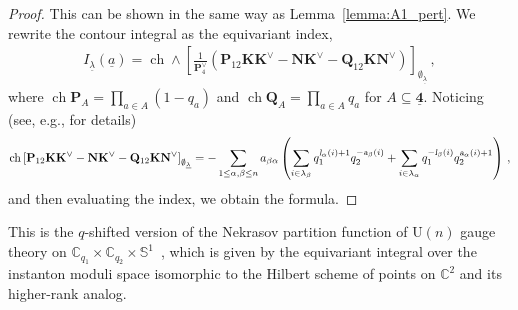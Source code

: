 \begin{proof}
    This can be shown in the same way as Lemma~\ref{lemma:A1_pert}.
    We rewrite the contour integral as the equivariant index,    
    \begin{align}
        I_{\underline{\lambda}} (\underline{a}) = \operatorname{ch} \wedge \left[ \frac{1}{\mathbf{P}_4^\vee} \left( \mathbf{P}_{12} \mathbf{K} \mathbf{K}^\vee - \mathbf{N} \mathbf{K}^\vee - \mathbf{Q}_{12} \mathbf{K} \mathbf{N}^\vee \right) \right]_{\emptyset_{\underline{\lambda}}} \, ,
    \end{align}
    where $\operatorname{ch} \mathbf{P}_{A} = \prod_{a \in A} (1-q_a)$ and $\operatorname{ch} \mathbf{Q}_{A} = \prod_{a \in A} q_{a}$ for $A \subseteq \underline{\mathbf{4}}$.
    Noticing (see, e.g., \cite{Nakajima:1999,Kimura:2020jxl} for details)
    \begin{align}
        \operatorname{ch} \left[ \mathbf{P}_{12} \mathbf{K} \mathbf{K}^\vee - \mathbf{N} \mathbf{K}^\vee - \mathbf{Q}_{12} \mathbf{K} \mathbf{N}^\vee \right]_{\emptyset_{\underline{\lambda}}} = - \sum_{1 \le \alpha, \beta \le n} a_{\beta \alpha} \left( \sum_{i \in \lambda_\beta} q_1^{\textsl{l}_\alpha(i)+1} q_2^{-\textsl{a}_\beta(i)} + \sum_{i \in \lambda_\alpha} q_1^{-\textsl{l}_\beta(i)} q_2^{\textsl{a}_\alpha(i)+1} \right) \, ,
    \end{align}
    and then evaluating the index, we obtain the formula.
\end{proof}
This is the $q$-shifted version of the Nekrasov partition function of $\mathrm{U}(n)$ gauge theory on $\mathbb{C}_{q_1} \times \mathbb{C}_{q_2} \times \mathbb{S}^1$~\cite{Nekrasov:2002qd,Nekrasov:2003rj}, which is given by the equivariant integral over the instanton moduli space isomorphic to the Hilbert scheme of points on $\mathbb{C}^2$ and its higher-rank analog.

